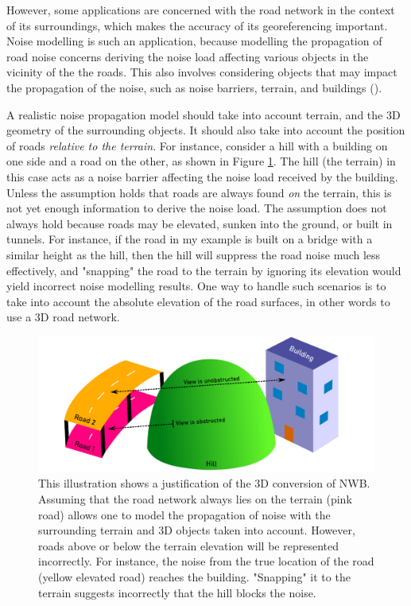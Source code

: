 However, some applications are concerned with the road network in the context of its surroundings, which makes the accuracy of its georeferencing important. Noise modelling is such an application, because modelling the propagation of road noise concerns deriving the noise load affecting various objects in the vicinity of the the roads. This also involves considering objects that may impact the propagation of the noise, such as noise barriers, terrain, and buildings (\cite{ishiyama_etal_1991, bennett_1997, guarnaccia_quartieri_2012}).

A realistic noise propagation model should take into account terrain, and the 3D geometry of the surrounding objects. It should also take into account the position of roads \textit{relative to the terrain}. For instance, consider a hill with a building on one side and a road on the other, as shown in Figure \ref{fig:justification_illu}. The hill (the terrain) in this case acts as a noise barrier affecting the noise load received by the building. Unless the assumption holds that roads are always found \textit{on} the terrain, this is not yet enough information to derive the noise load. The assumption does not always hold because roads may be elevated, sunken into the ground, or built in tunnels. For instance, if the road in my example is built on a bridge with a similar height as the hill, then the hill will suppress the road noise much less effectively, and "snapping" the road to the terrain by ignoring its elevation would yield incorrect noise modelling results. One way to handle such scenarios is to take into account the absolute elevation of the road surfaces, in other words to use a 3D road network.

\begin{figure}
    \centering
    \includegraphics[width=\linewidth]{final_report/figs/justification_illu.pdf}
    \caption[Illustration of the 3D conversion justification]{This illustration shows a justification of the 3D conversion of NWB. Assuming that the road network always lies on the terrain (pink road) allows one to model the propagation of noise with the surrounding terrain and 3D objects taken into account. However, roads above or below the terrain elevation will be represented incorrectly. For instance, the noise from the true location of the road (yellow elevated road) reaches the building. "Snapping" it to the terrain suggests incorrectly that the hill blocks the noise.}
    \label{fig:justification_illu}
\end{figure}

